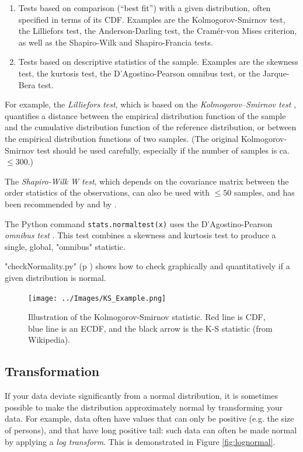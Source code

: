 \begin{enumerate}
  \item Tests based on comparison (“best fit”) with a given distribution, often specified in terms of its CDF. Examples are the Kolmogorov-Smirnov test, the Lilliefors test, the Anderson-Darling test, the Cramér-von Mises criterion, as well as the Shapiro-Wilk and Shapiro-Francia tests.
  \item Tests based on descriptive statistics of the sample. Examples are the skewness test, the kurtosis test, the D’Agostino-Pearson omnibus test, or the Jarque-Bera test.
\end{enumerate}

For example, the \emph{Lilliefors test}, which is based on the \emph{Kolmogorov--Smirnov test} , quantifies a distance between the empirical distribution function of the sample and the cumulative distribution function of the reference distribution, or between the empirical distribution functions of two samples. (The original Kolmogorov-Smirnov test should be used carefully, especially if the number of samples is ca. $\leq 300$.)

The \emph{Shapiro-Wilk W test}, which depends on the covariance matrix between the order statistics of the observations, can also be used with $\leq 50$ samples, and has been recommended by \cite{altman99} and by \cite{Ghasemi2012}.

The Python command \lstinline{stats.normaltest(x)} uses the D’Agostino-Pearson \emph{omnibus test} . This test combines a skewness and kurtosis test to produce a single, global, "omnibus" statistic.

\PyImg "checkNormality.py" (p \pageref{py:checkNormality}) shows how to check graphically and quantitatively if a given distribution is normal.

\begin{figure}
  \centering
  \texttt{[image: ../Images/KS\_Example.png]}\\
  \caption{Illustration of the Kolmogorov-Smirnov statistic. Red line is CDF, blue line is an ECDF, and the black arrow is the K-S statistic (from Wikipedia).}\label{fig:ksplot}
\end{figure}


\subsection{Transformation} 
If your data deviate significantly from a normal distribution, it is sometimes possible to make the distribution approximately normal by transforming your data. For example, data often have values that can only be positive (e.g. the size of persons), and that have  long positive tail: such data can often be made normal by applying a \emph{log transform}. This is demonstrated in Figure \ref{fig:lognormal}.


